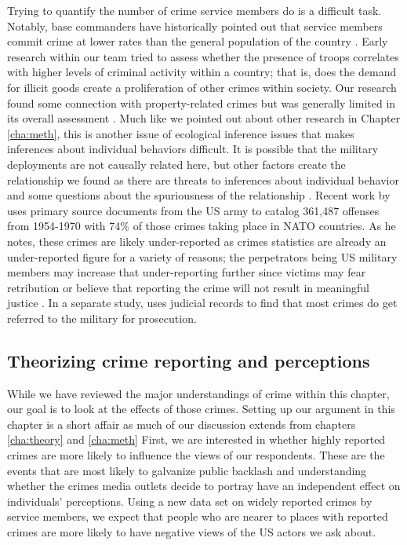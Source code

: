 Trying to quantify the number of crime service members do is a difficult task. Notably, base commanders have historically pointed out that service members commit crime at lower rates than the general population of the country \cite{Gillem2007}. Early research within our team tried to assess whether the presence of troops correlates with higher levels of criminal activity within a country; that is, does the demand for illicit goods create a proliferation of other crimes within society. Our research found some connection with property-related crimes but was generally limited in its overall assessment \cite{allenandflynn2013}. Much like we pointed out about other research in Chapter \ref{cha:meth}, this is another issue of ecological inference issues that makes inferences about individual behaviors difficult. It is possible that the military deployments are not causally related here, but other factors create the relationship we found as there are threats to inferences about individual behavior and some questions about the spuriousness of the relationship \cite{King2004}. Recent work by  uses primary source documents from the US army to catalog 361,487 offenses from 1954-1970 with 74\% of those crimes taking place in NATO countries. As he notes, these crimes are likely under-reported as crimes statistics are already an under-reported figure for a variety of reasons; the perpetrators being US military members may increase that under-reporting further since victims may fear retribution or believe that reporting the crime will not result in meaningful justice \cite{allenandflynn2013}. In a separate study,  uses judicial records to find that most crimes do get referred to the military for prosecution. 





\subsection*{Theorizing crime reporting and perceptions}

While we have reviewed the major understandings of crime within this chapter, our goal is to look at the effects of those crimes. Setting up our argument in this chapter is a short affair as much of our discussion extends from chapters \ref{cha:theory} and \ref{cha:meth} First, we are interested in whether highly reported crimes are more likely to influence the views of our respondents. These are the events that are most likely to galvanize public backlash and understanding whether the crimes media outlets decide to portray have an independent effect on individuals' perceptions. Using a new data set on widely reported crimes by service members, we expect that people who are nearer to places with reported crimes are more likely to have negative views of the US actors we ask about.

